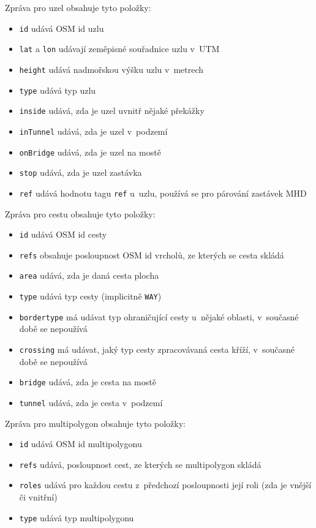 Zpráva pro uzel obsahuje tyto položky:
\begin{itemize}
	\item {\tt id} udává OSM id uzlu 
	\item {\tt lat} a {\tt lon} udávají zeměpisné souřadnice uzlu v~UTM
	\item {\tt height} udává nadmořskou výšku uzlu v~metrech
	\item {\tt type} udává typ uzlu
	\item {\tt inside} udává, zda je uzel uvnitř nějaké překážky
	\item {\tt inTunnel} udává, zda je uzel v~podzemí
	\item {\tt onBridge} udává, zda je uzel na mostě
	\item {\tt stop} udává, zda je uzel zastávka
	\item {\tt ref} udává hodnotu tagu {\tt ref} u~uzlu, používá se pro
	párování zastávek MHD
\end{itemize}  
Zpráva pro cestu obsahuje tyto položky:
\begin{itemize}
	\item {\tt id} udává OSM id cesty
	\item {\tt refs} obsahuje posloupnost OSM id vrcholů, ze kterých se
	cesta skládá
	\item {\tt area} udává, zda je daná cesta plocha 
	\item {\tt type} udává typ cesty (implicitně {\tt WAY}) 
	\item {\tt bordertype} má udávat typ ohraničující cesty u~nějaké
	oblasti, v~současné době se nepoužívá
	\item {\tt crossing} má udávat, jaký typ cesty zpracovávaná cesta kříží,
	v~současné době se nepoužívá  
	\item {\tt bridge} udává, zda je cesta na mostě
	\item {\tt tunnel} udává, zda je cesta v~podzemí
\end{itemize} 
Zpráva pro multipolygon obsahuje tyto položky:
\begin{itemize}
	\item {\tt id} udává OSM id multipolygonu
	\item {\tt refs} udává, posloupnost cest, ze kterých se multipolygon
	skládá
	\item {\tt roles} udává pro každou cestu z~předchozí posloupnosti její
	roli (zda je vnější či vnitřní)
	\item {\tt type} udává typ multipolygonu
\end{itemize}  
